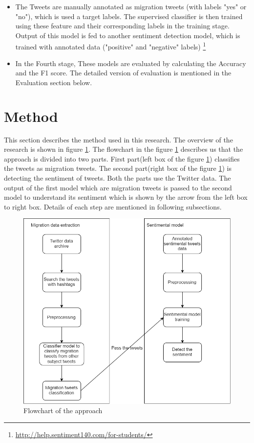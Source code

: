 \begin{itemize}
   \item The Tweets are manually annotated as migration tweets (with labels "yes" or "no"), which is used a target labels. The supervised classifier is then trained
using these feature and their corresponding labels in the training stage. Output of this model is fed to another sentiment detection model, which is trained with annotated data \cite{stanford_data}("positive" and "negative" labels) \footnote{\url{http://help.sentiment140.com/for-students/}}
  
  \item In the Fourth stage, These models are evaluated by calculating the Accuracy and the F1 score. The detailed version of evaluation is mentioned in the Evaluation section below.
\end{itemize}



\section{Method}
This section describes the method used in this research. The overview of the research is shown in figure \ref{fig:flowchart_thesis}. The flowchart in the figure \ref{fig:flowchart_thesis} describes us that the approach is divided into two parts. First part(left box of the figure \ref{fig:flowchart_thesis}) classifies the tweets as migration tweets. The second part(right box of the figure \ref{fig:flowchart_thesis}) is detecting the sentiment of tweets. Both the parts use the Twitter data. The output of the first model which are migration tweets is passed to the second model to understand its sentiment which is shown by the arrow from the left box to right box. Details of each step are mentioned in following subsections.

\begin{figure}
    \centering
    \includegraphics[width=0.75\linewidth]{images/flowchart.png}
    \caption{Flowchart of the approach}
    \label{fig:flowchart_thesis}
\end{figure}
